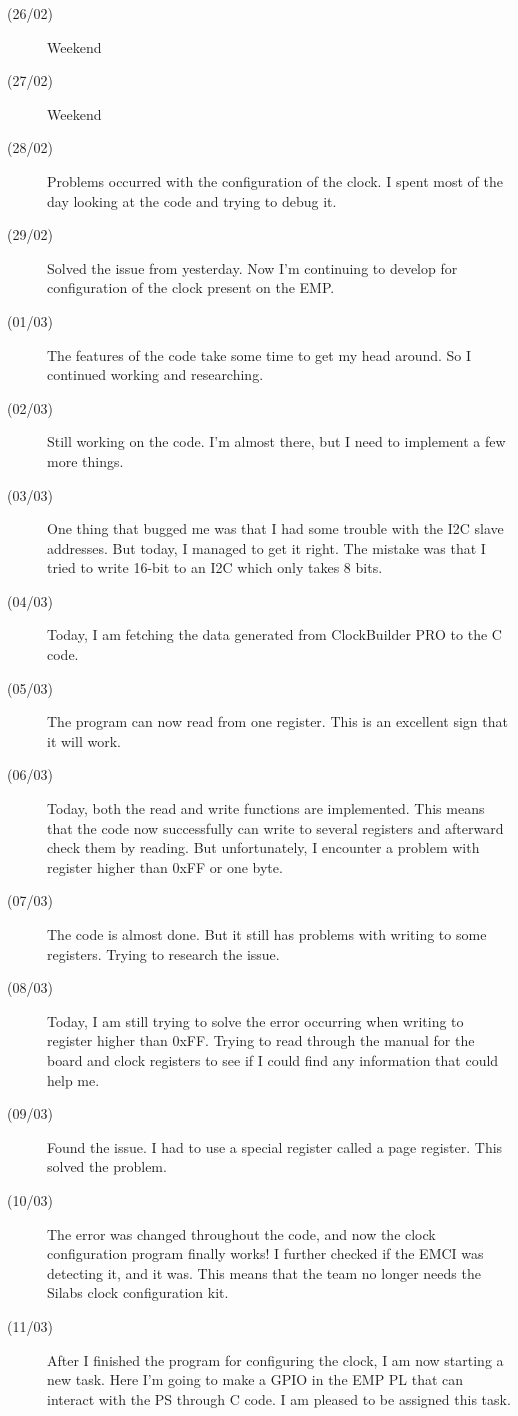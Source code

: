 \begin{description}
\item[(26/02)] Weekend
\item[(27/02)] Weekend
\item[(28/02)] Problems occurred with the configuration of the clock. I spent most of the day looking at the code and trying to debug it.
\item[(29/02)] Solved the issue from yesterday. Now I'm continuing to develop for configuration of the clock present on the EMP. 
\item[(01/03)] The features of the code take some time to get my head around. So I continued working and researching. 
\item[(02/03)] Still working on the code. I'm almost there, but I need to implement a few more things. 
\item[(03/03)] One thing that bugged me was that I had some trouble with the I2C slave addresses. But today, I managed to get it right. The mistake was that I tried to write 16-bit to an I2C which only takes 8 bits. 
\item[(04/03)] Today, I am fetching the data generated from ClockBuilder PRO to the C code.
\item[(05/03)] The program can now read from one register. This is an excellent sign that it will work.
\item[(06/03)] Today, both the read and write functions are implemented. This means that the code now successfully can write to several registers and afterward check them by reading. But unfortunately, I  encounter a problem with register higher than 0xFF or one byte. 
\item[(07/03)] The code is almost done. But it still has problems with writing to some registers. Trying to research the issue. 
\item[(08/03)] Today, I am still trying to solve the error occurring when writing to register higher than 0xFF. Trying to read through the manual for the board and clock registers to see if I could find any information that could help me.
\item[(09/03)] Found the issue. I had to use a special register called a page register. This solved the problem. 
\item[(10/03)] The error was changed throughout the code, and now the clock configuration program finally works! I further checked if the EMCI was detecting it, and it was. This means that the team no longer needs the Silabs clock configuration kit. 
\item[(11/03)] After I finished the program for configuring the clock, I am now starting a new task. Here I'm going to make a GPIO in the EMP PL that can interact with the PS through C code. I am pleased to be assigned this task. 

\end{description}

